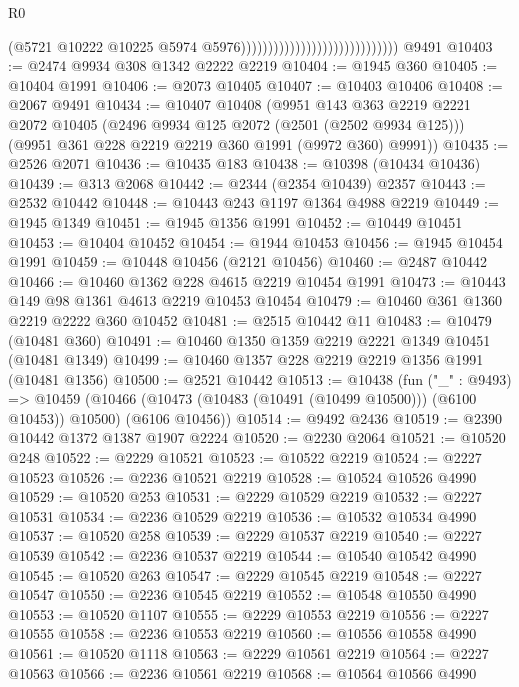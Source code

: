 \begin{lexlean}{R0}
\begin{coremodule}
                                                            (@5721
                                                              @10222
                                                              @10225
                                                              @5974
                                                              @5976)))))))))))))))))))))))))))))
    @9491
@10403 := @2474 @9934 @308 @1342 @2222 @2219
@10404 := @1945 @360
@10405 := @10404 @1991
@10406 := @2073 @10405
@10407 := @10403 @10406
@10408 := @2067 @9491
@10434 := @10407
    @10408
    (@9951
      @143
      @363
      @2219
      @2221
      @2072
      @10405
      (@2496 @9934 @125 @2072 (@2501 (@2502 @9934 @125)))
      (@9951 @361 @228 @2219 @2219 @360 @1991 (@9972 @360) @9991))
@10435 := @2526 @2071
@10436 := @10435 @183
@10438 := @10398 (@10434 @10436)
@10439 := @313 @2068
@10442 := @2344 (@2354 @10439) @2357
@10443 := @2532 @10442
@10448 := @10443 @243 @1197 @1364 @4988 @2219
@10449 := @1945 @1349
@10451 := @1945 @1356 @1991
@10452 := @10449 @10451
@10453 := @10404 @10452
@10454 := @1944 @10453
@10456 := @1945 @10454 @1991
@10459 := @10448 @10456 (@2121 @10456)
@10460 := @2487 @10442
@10466 := @10460 @1362 @228 @4615 @2219 @10454 @1991
@10473 := @10443 @149 @98 @1361 @4613 @2219 @10453 @10454
@10479 := @10460 @361 @1360 @2219 @2222 @360 @10452
@10481 := @2515 @10442 @11
@10483 := @10479 (@10481 @360)
@10491 := @10460 @1350 @1359 @2219 @2221 @1349 @10451 (@10481 @1349)
@10499 := @10460 @1357 @228 @2219 @2219 @1356 @1991 (@10481 @1356)
@10500 := @2521 @10442
@10513 := @10438
    (fun ("_" : @9493) =>
    @10459 (@10466 (@10473 (@10483 (@10491 (@10499 @10500))) (@6100 @10453)) @10500) (@6106 @10456))
@10514 := @9492 @2436
@10519 := @2390 @10442 @1372 @1387 @1907 @2224
@10520 := @2230 @2064
@10521 := @10520 @248
@10522 := @2229 @10521
@10523 := @10522 @2219
@10524 := @2227 @10523
@10526 := @2236 @10521 @2219
@10528 := @10524 @10526 @4990
@10529 := @10520 @253
@10531 := @2229 @10529 @2219
@10532 := @2227 @10531
@10534 := @2236 @10529 @2219
@10536 := @10532 @10534 @4990
@10537 := @10520 @258
@10539 := @2229 @10537 @2219
@10540 := @2227 @10539
@10542 := @2236 @10537 @2219
@10544 := @10540 @10542 @4990
@10545 := @10520 @263
@10547 := @2229 @10545 @2219
@10548 := @2227 @10547
@10550 := @2236 @10545 @2219
@10552 := @10548 @10550 @4990
@10553 := @10520 @1107
@10555 := @2229 @10553 @2219
@10556 := @2227 @10555
@10558 := @2236 @10553 @2219
@10560 := @10556 @10558 @4990
@10561 := @10520 @1118
@10563 := @2229 @10561 @2219
@10564 := @2227 @10563
@10566 := @2236 @10561 @2219
@10568 := @10564 @10566 @4990

\end{coremodule}
\end{lexlean}

